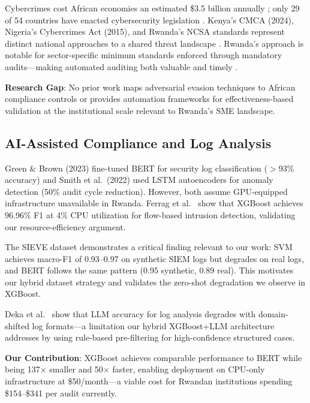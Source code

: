 \documentclass[11pt,conference]{IEEEtran}
\begin{document}
Cybercrimes cost African economies an estimated \$3.5 billion annually \cite{serianu_africa}; only 29 of 54 countries have enacted cybersecurity legislation \cite{itu_africa_cyber}. Kenya's CMCA (2024), Nigeria's Cybercrimes Act (2015), and Rwanda's NCSA standards represent distinct national approaches to a shared threat landscape \cite{kenya_cyber_law, nigeria_cyber, ncsa2023}. Rwanda's approach is notable for sector-specific minimum standards enforced through mandatory audits---making automated auditing both valuable and timely \cite{rwanda_strategy_2024}.

\textbf{Research Gap}: No prior work maps adversarial evasion techniques to African compliance controls or provides automation frameworks for effectiveness-based validation at the institutional scale relevant to Rwanda's SME landscape.

\subsection{AI-Assisted Compliance and Log Analysis}

Green \& Brown (2023) \cite{bert_audit} fine-tuned BERT for security log classification ($>$93\% accuracy) and Smith et al.\ (2022) \cite{lstm_audit} used LSTM autoencoders for anomaly detection (50\% audit cycle reduction). However, both assume GPU-equipped infrastructure unavailable in Rwanda. Ferrag et al.\ \cite{ferrag2025} show that XGBoost achieves 96.96\% F1 at 4\% CPU utilization for flow-based intrusion detection, validating our resource-efficiency argument.

The SIEVE dataset \cite{sieve_dataset} demonstrates a critical finding relevant to our work: SVM achieves macro-F1 of 0.93--0.97 on synthetic SIEM logs but degrades on real logs, and BERT follows the same pattern (0.95 synthetic, 0.89 real). This motivates our hybrid dataset strategy and validates the zero-shot degradation we observe in XGBoost.

Deka et al.\ \cite{deka2024} show that LLM accuracy for log analysis degrades with domain-shifted log formats---a limitation our hybrid XGBoost+LLM architecture addresses by using rule-based pre-filtering for high-confidence structured cases.

\textbf{Our Contribution}: XGBoost achieves comparable performance to BERT while being 137$\times$ smaller and 50$\times$ faster, enabling deployment on CPU-only infrastructure at \$50/month---a viable cost for Rwandan institutions spending \$154--\$341 per audit currently.
\end{document}
